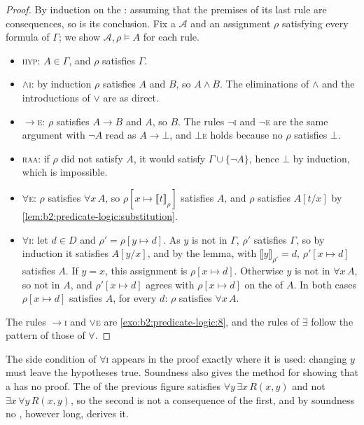 \begin{proof}
By induction on the : assuming that the premises of its last rule are consequences, so is its conclusion. Fix
a  $\mathcal{A}$ and an assignment $\rho$ satisfying every formula of $\Gamma$; we show $\mathcal{A}, \rho
\models A$ for each rule.
\begin{itemize}
\item \textsc{hyp}: $A \in \Gamma$, and $\rho$ satisfies $\Gamma$.
\item $\wedge$\textsc{i}: by induction $\rho$ satisfies $A$ and $B$, so $A \wedge B$. The eliminations of $\wedge$ and
the introductions of $\vee$ are as direct.
\item $\to$\textsc{e}: $\rho$ satisfies $A \to B$ and $A$, so $B$. The rules $\neg$\textsc{i} and $\neg$\textsc{e} are
the same argument with $\neg A$ read as $A \to \bot$, and $\bot$\textsc{e} holds because no $\rho$ satisfies $\bot$.
\item \textsc{raa}: if $\rho$ did not satisfy $A$, it would satisfy $\Gamma \cup \{\neg A\}$, hence $\bot$ by induction,
which is impossible.
\item $\forall$\textsc{e}: $\rho$ satisfies $\forall x\, A$, so $\rho[x \mapsto \llbracket t \rrbracket_\rho]$ satisfies
$A$, and $\rho$ satisfies $A[t/x]$ by \cref{lem:b2:predicate-logic:substitution}.
\item $\forall$\textsc{i}: let $d \in D$ and $\rho' = \rho[y \mapsto d]$. As $y$ is not  in $\Gamma$, $\rho'$
satisfies $\Gamma$, so by induction it satisfies $A[y/x]$, and by the lemma, with $\llbracket y \rrbracket_{\rho'} = d$,
$\rho'[x \mapsto d]$ satisfies $A$. If $y = x$, this assignment is $\rho[x \mapsto d]$. Otherwise $y$ is not  in
$\forall x\, A$, so not in $A$, and $\rho'[x \mapsto d]$ agrees with $\rho[x \mapsto d]$ on the  of $A$. In
both cases $\rho[x \mapsto d]$ satisfies $A$, for every $d$: $\rho$ satisfies $\forall x\, A$.
\end{itemize}
The rules $\to$\textsc{i} and $\vee$\textsc{e} are \cref{exo:b2:predicate-logic:8}, and the rules of $\exists$ follow
the pattern of those of $\forall$.
\end{proof}

The side condition of $\forall$\textsc{i} appears in the proof exactly where it is used: changing $y$ must leave the
hypotheses true. Soundness also gives the method for showing that a  has no proof. The  of the
previous figure satisfies $\forall y\, \exists x\, R(x, y)$ and not $\exists x\, \forall y\, R(x, y)$, so the second is
not a consequence of the first, and by soundness no , however long, derives it.

